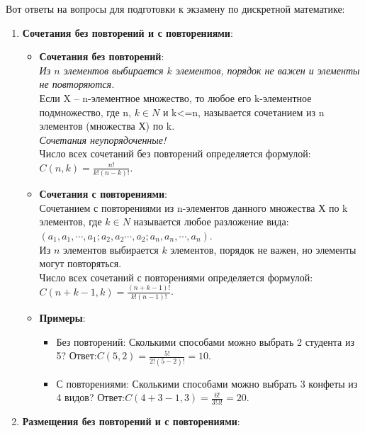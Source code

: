 \documentclass[
]{article}
\author{}
\date{}
\providecommand{\tightlist}{%
  \setlength{\itemsep}{0pt}\setlength{\parskip}{0pt}}
\begin{document}
Вот ответы на вопросы для подготовки к экзамену по дискретной
математике:

\begin{enumerate}
\def\labelenumi{\arabic{enumi}.}
\tightlist
\item
  \textbf{Сочетания без повторений и с повторениями}:

  \begin{itemize}
  \tightlist
  \item
    \textbf{Сочетания без повторений}:\\
    \emph{Из \(n\) элементов выбирается \(k\) элементов, порядок не важен и элементы не
    повторяются. } \\Если X -- n-элементное множество, то любое его
    k-элементное подмножество, где n, \(k\in N\) и k\textless=n,
    называется сочетанием из n элементов (множества Х) по k.\\
    \emph{Сочетания неупорядоченные! }\\Число всех сочетаний без
    повторений определяется формулой:
    \(C(n, k) =\)\(\frac{n!}{k!(n-k)!}\).
  \item
    \textbf{Сочетания с повторениями}:\\ 
    Сочетанием с повторениями из
    n-элементов данного множества Х по k элементов, где \(k\in N\)
    называется любое разложение вида:
    \((a_1,a_1,\cdots,a_1;a_2,a_2\cdots,a_2;a_n,a_n,\cdots,a_n)\).\\ Из
    \(n\) элементов выбирается \(k\) элементов, порядок не важен, но
    элементы могут повторяться.\\ Число всех сочетаний с повторениями
    определяется формулой: \(C(n+k-1, k) = \frac{(n+k-1)!}{k!(n-1)!}\).
  \item
    \textbf{Примеры}:

    \begin{itemize}
    \tightlist
    \item
      Без повторений: Сколькими способами можно выбрать 2 студента из 5?
      Ответ:\(C(5, 2) = \frac{5!}{2!(5-2)!} = 10\).
    \item
      С повторениями: Сколькими способами можно выбрать 3 конфеты из 4
      видов? Ответ:\(C(4+3-1, 3) = \frac{6!}{3!3!} = 20\).
    \end{itemize}
  \end{itemize}
\item
  \textbf{Размещения без повторений и с повторениями}:


\end{enumerate}
\end{document}
